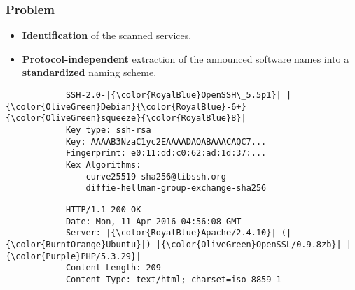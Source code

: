 \documentclass[aspectratio=169,xcolor={usenames,dvipsnames}]{beamer}
\newcommand{\ispace}{\vspace{10pt}}
\begin{document}
\begin{frame}[fragile]
	\frametitle{Problem}
	
	\begin{itemize}
		\item \textbf{Identification} of the scanned services.
		\item \textbf{Protocol-independent} extraction of the announced software names into a \textbf{standardized} naming scheme.
	\end{itemize}
	
	\ispace
	
	\begin{multicols}{2}
		\begin{verbatim}
			SSH-2.0-|{\color{RoyalBlue}OpenSSH\_5.5p1}| |{\color{OliveGreen}Debian}{\color{RoyalBlue}-6+}{\color{OliveGreen}squeeze}{\color{RoyalBlue}8}|
			Key type: ssh-rsa
			Key: AAAAB3NzaC1yc2EAAAADAQABAAACAQC7...
			Fingerprint: e0:11:dd:c0:62:ad:1d:37:...
			Kex Algorithms:
				curve25519-sha256@libssh.org
				diffie-hellman-group-exchange-sha256
		\end{verbatim}
		\begin{verbatim}
			HTTP/1.1 200 OK
			Date: Mon, 11 Apr 2016 04:56:08 GMT
			Server: |{\color{RoyalBlue}Apache/2.4.10}| (|{\color{BurntOrange}Ubuntu}|) |{\color{OliveGreen}OpenSSL/0.9.8zb}| |{\color{Purple}PHP/5.3.29}|
			Content-Length: 209
			Content-Type: text/html; charset=iso-8859-1 
		\end{verbatim}
	\end{multicols}
\end{frame}
\end{document}
